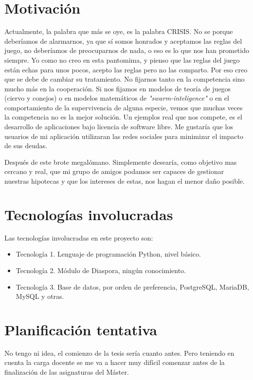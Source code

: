 \documentclass[10pt]{article}
\begin{document}
\section{Motivación}

Actualmente, la palabra que más se oye, es la palabra CRISIS. No se porque deberíamos de alarmarnos, ya que sí somos honrados y aceptamos las reglas del juego, no deberíamos de preocuparnos de nada, o eso es lo que nos han prometido siempre. Yo como no creo en esta pantomima, y pienso que las reglas del juego están echas para unos pocos, acepto las reglas pero no las comparto. Por eso creo que se debe de cambiar su tratamiento. No fijarnos tanto en la competencia sino mucho más en la cooperación. Si nos fijamos en modelos de teoría de juegos (ciervo y conejos) o en modelos matemáticos de \textit{"swarm-inteligence"} o en el comportamiento de la supervivencia de alguna especie, vemos que muchas veces la competencia no es la mejor solución. Un ejemplos real que nos compete, es el desarrollo de aplicaciones bajo licencia de software libre. Me gustaría que los usuarios de mi aplicación utilizaran las redes sociales para minimizar el impacto de sus deudas.

Después de este brote megalómano. Simplemente desearía, como objetivo mas cercano y real, que mi grupo de amigos podamos ser capaces de gestionar nuestras hipotecas y que los intereses de estas, nos hagan el menor daño posible.

\section{Tecnologías involucradas}

Las tecnologías involucradas en este proyecto son:

\begin{itemize}
  \item Tecnología 1. Lenguaje de programación Python, nivel básico.
  \item Tecnología 2. Módulo de Diaspora, ningún conocimiento.
  \item Tecnología 3. Base de datos, por orden de preferencia, PostgreSQL, MariaDB, MySQL y otras.
\end{itemize}


\section{Planificación tentativa}

No tengo ni idea, el comienzo de la tesis sería cuanto antes. Pero teniendo en cuenta la carga docente se me va a hacer muy difícil comenzar antes de la finalización de las asignaturas del Máster.
\end{document}
